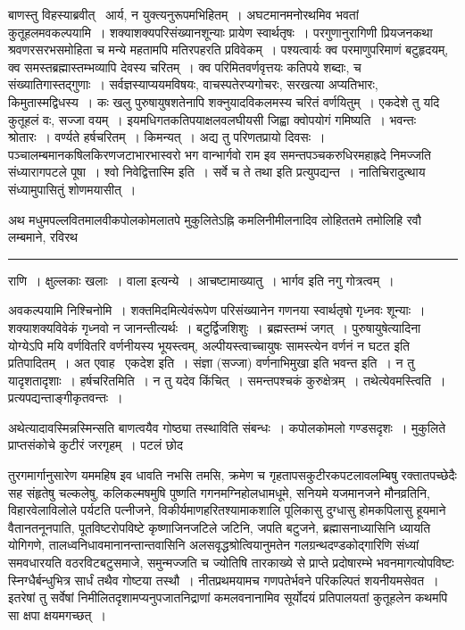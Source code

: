 \documentclass[11pt, openany]{book}
\begin{document}
बाणस्तु विहस्याब्रवीत् \textendash\ आर्य, न युक्त्यनुरूपमभिहितम्~। अघटमानमनोरथमिव भवतां कुतूहलमवकल्पयामि~। शक्याशक्यपरिसंख्यानशून्याः प्रायेण स्वार्थतृषः~। परगुणानुरागिणी प्रियजनकथा श्रवणरसरभसमोहिता च मन्ये महतामपि मतिरपहरति प्रविवेकम्~। पश्यत्वार्यः क्व परमाणुपरिमाणं बटुहृदयम्, क्व समस्तब्रह्मास्तम्भव्यापि देवस्य चरितम्~। क्व परिमितवर्णवृत्तयः कतिपये शब्दाः, च संख्यातिगास्तद्गुणाः~। सर्वज्ञस्याप्ययमविषयः, वाचस्पतेरप्यगोचरः, सरखत्या अप्यतिभारः, किमुतास्मद्विधस्य~। कः खलु पुरुषायुषशतेनापि शक्नुयादविकलमस्य चरितं वर्णयितुम्~। एकदेशे तु यदि कुतूहलं वः, सज्जा वयम्~। इयमधिगतकतिपयाक्षलवलघीयसी जिह्वा क्वोपयोगं गमिष्यति~। भवन्तः श्रोतारः~। वर्ण्यते हर्षचरितम्~। किमन्यत्~। अद्य तु परिणतप्रायो दिवसः~। पञ्चालम्बमानकषिलकिरणजटाभारभास्वरो भग वान्भार्गवो राम इव समन्तपञ्चकरुधिरमहाह्रदे निमज्जति संध्यारागपटले पूषा~। श्वो निवेद्वित्तास्मि इति~। सर्वे च ते {\qt तथा} इति प्रत्युपद्यन्त~। नातिचिरादुत्थाय संध्यामुपासितुं शोणमयासीत्~।

अथ मधुमपल्लवितमालवीकपोलकोमलातपे मुकुलितेऽह्नि कमलिनीमीलनादिव लोहिततमे तमोलिहि रवौ लम्बमाने, रविरथ\textendash

\vspace{2mm}
\hrule

\noindent
{\s राणि~। क्षुल्लकाः खलाः~। वाला इत्यन्ये~। आचष्टामाख्यातु~। भार्गव इति नगु गोत्रत्वम्~।

अवकल्पयामि निश्चिनोमि~। शक्तमिदमित्येवंरूपेण परिसंख्यानेन गणनया स्वार्थतृषो गृध्नवः शून्याः~। शक्याशक्यविवेकं गृध्नवो न जानन्तीत्यर्थः~। बटुर्द्विजशिशुः~। ब्रह्मस्तम्भं जगत्~। पुरुषायुषेत्यादिना योग्येऽपि मयि वर्णवितरि वर्णनीयस्य भूयस्त्वम्, अल्पीयस्त्वाच्चायुषः सामस्त्येन वर्णनं न घटत इति प्रतिपादितम्~। अत एवाह \textendash\ {\qtt एकदेश इति}~। संज्ञा (सज्जा) वर्णनाभिमुखा इति भवन्त इति~। न तु यादृशतादृशाः~। हर्षचरितमिति~। न तु यदेव किंचित्~। समन्तपश्चकं कुरुक्षेत्रम्~। तथेत्येवमस्त्विति~। प्रत्यपद्यन्ताङ्गीकृतवन्तः~।

अथेत्यादावस्मिन्नस्मिन्सति बाणत्वयैव गोष्ठ्या तस्थाविति संबन्धः~। कपोलकोमलो गण्डसदृशः~। मुकुलिते प्राप्तसंकोचे कुटीरं जरगृहम्~। पटलं छोद\textendash}

\newpage

\noindent
तुरगमार्गानुसारेण यममहिष इव धावति नभसि तमसि, क्रमेण च गृहतापसकुटीरकपटलावलम्बिषु रक्तातपच्छेदैः सह संहृतेषु चल्कलेषु, कलिकल्मषमुषि पुष्णति गगनमग्निहोलधामधूमे, सनियमे यजमानजने मौनव्रतिनि, विहारवेलाविलोले पर्यटति पत्नीजने, विकीर्यमाणहरितश्यामाकशालि पूलिकासु दुग्धासु होमकपिलासु हूयमाने वैतानतनूनपाति, पूतविष्टरोपविष्टे कृष्णाजिनजटिले जटिनि, जपति बटुजने, ब्रह्मासनाध्यासिनि ध्यायति योगिगणे, तालध्वनिधावमानानन्तान्तवासिनि अलसवृद्धश्रोत्वियानुमतेन गलग्रन्थदण्डकोद्गारिणि संध्यां समवधारयति वठरविटबटुसमाजे, समुन्मज्जति च ज्योतिषि तारकाख्ये से प्राप्ते प्रदोषारम्भे भवनमागत्योपविष्टः स्निग्धैर्बन्धुभित्र सार्धं तथैव गोष्टया तस्थौ~। नीतप्रथमयामच गणपतेर्भवने परिकल्पितं शयनीयमसेवत~। इतरेषां तु सर्वेषां निमीलितदृशामप्यनुपजातनिद्राणां कमलवनानामिव सूर्योदयं प्रतिपालयतां कुतूहलेन कथमपि सा क्षपा क्षयमगच्छत्~।
\end{document}
